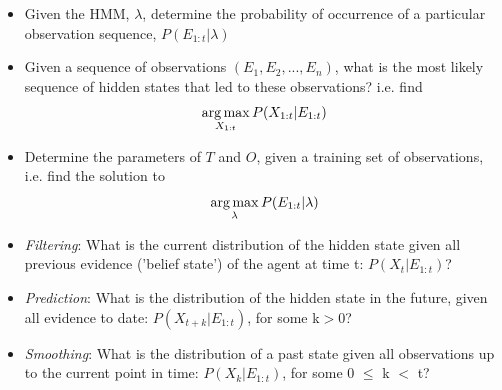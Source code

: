 \begin{itemize}

    \item Given the HMM, $\lambda$, determine the probability of occurrence of a particular observation sequence, $P(E_{1:t} | \lambda)$
    
    \item Given a sequence of observations $(E_1, E_2, ..., E_n)$, what is the most likely sequence of hidden states that led to these observations? i.e. find \[\operatorname*{arg\,max}_{X_{1:t}} P(X_{1:t} | E_{1:t})\]
    
    \item Determine the parameters of $T$ and $O$, given a training set of observations, i.e. find the solution to \[\operatorname*{arg\,max}_{\lambda} P(E_{1:t} | \lambda)\]
    
    \item \textit{Filtering}: What is the current distribution of the hidden state given all previous evidence ('belief state') of the agent at time t: $P(X_t | E_{1:t})$?
    
    \item \textit{Prediction}: What is the distribution of the hidden state in the future, given all evidence to date: $P(X_{t+k} | E_{1:t})$, for some k$>$0?
    
    \item \textit{Smoothing}: What is the distribution of a past state given all observations up to the current point in time: $P(X_k | E_{1:t})$, for some 0 $\leq$ k $<$ t?
    
\end{itemize}
\par



